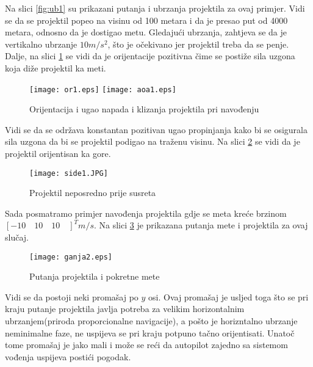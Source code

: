 Na slici \ref{fig:ub1} su prikazani putanja i ubrzanja projektila za ovaj primjer. Vidi se 
da se projektil popeo na visinu od 100 metara i da je presao put od 4000 metara, odnosno da je 
dostigao metu. Gledajući ubrzanja, zahtjeva se da je vertikalno ubrzanje $10m/s^2$, što je 
očekivano jer projektil treba da se penje. Dalje, na slici \ref{fig:or1} se vidi da 
je orijentacije pozitivna čime se postiže sila uzgona koja diže projektil ka meti. 
\begin{figure}[!ht]
    \centering
    \texttt{[image: or1.eps]}
    \texttt{[image: aoa1.eps]}
    \caption{Orijentacija i ugao napada i klizanja projektila pri navođenju}
    \label{fig:or1}
\end{figure}
Vidi se da se održava konstantan pozitivan ugao propinjanja kako bi se osigurala 
sila uzgona da bi se projektil podigao na traženu visinu. Na slici \ref{fig:side1} se 
vidi da je projektil orijentisan ka gore. 
\begin{figure}[!ht]
    \centering
    \texttt{[image: side1.JPG]}
    \caption{Projektil neposredno prije susreta}
    \label{fig:side1}
\end{figure}
Sada posmatramo primjer navođenja projektila gdje se meta kreće brzinom $[-10\quad 10\quad 10\quad]^T m/s$.
Na slici \ref{fig:ganja2} je prikazana putanja mete i projektila za ovaj slučaj. 
\begin{figure}[!ht]
    \centering
    \texttt{[image: ganja2.eps]}
    \caption{Putanja projektila i pokretne mete}
    \label{fig:ganja2}
\end{figure}
Vidi se da postoji neki promašaj po $y$ osi. Ovaj promašaj je usljed toga što se pri 
kraju putanje projektila javlja potreba za velikim horizontalnim ubrzanjem(priroda proporcionalne navigacije), 
a pošto je horizntalno ubrzanje neminimalne faze, ne uspijeva se pri kraju potpuno tačno orijentisati. Unatoč tome 
promašaj je jako mali i može se reći da autopilot zajedno sa sistemom vođenja uspijeva 
postići pogodak. 


